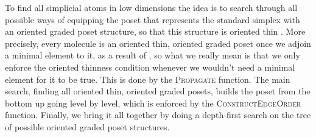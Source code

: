 \documentclass[12pt,a4paper]{article}
\numberwithin{equation}{section}
\begin{document}
To find all simplicial atoms in low dimensions the idea is to search through all possible ways of equipping the poset that represents the standard simplex with an oriented graded poset structure, so that this structure is oriented thin \cite[Def.\,2.3.10]{hadzihasanovic}. More precisely, every molecule is an oriented thin, oriented graded poset once we adjoin a minimal element to it, as a result of \cite[Prop.\,5.3.4]{hadzihasanovic}, so what we really mean is that we only enforce the oriented thinness condition whenever we wouldn't need a minimal element for it to be true. This is done by the \textsc{Propagate} function. The main search, finding all oriented thin, oriented graded posets, builds the poset from the bottom up going level by level, which is enforced by the \textsc{ConstructEdgeOrder} function. Finally, we bring it all together by doing a depth-first search on the tree of possible oriented graded poset structures.
\end{document}
